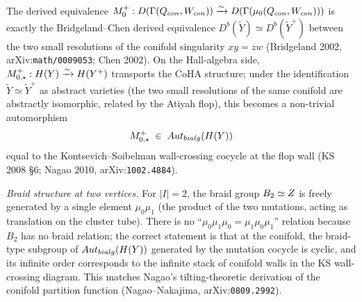 \begin{example}
The derived equivalence $M_0^{+} : D(\Gamma(Q_{con},
W_{con})) \xrightarrow{\sim} D(\Gamma(\mu_0(Q_{con},
W_{con})))$ is exactly the Bridgeland--Chen derived equivalence
$D^b(\tilde Y) \simeq D^b(\tilde Y^{+})$ between the two small resolutions
of the conifold singularity $xy = zw$ (Bridgeland 2002, arXiv:\texttt{math/0009053};
Chen 2002). On the Hall-algebra side, $M_{0,\star}^{+} :
H(Y) \xrightarrow{\sim} H(Y^{+})$ transports the CoHA
structure; under the identification $\tilde Y \simeq \tilde Y^{+}$ as
abstract varieties (the two small resolutions of the same conifold are
abstractly isomorphic, related by the Atiyah flop), this becomes a
non-trivial automorphism
\[
  M_{0,\star}^{+} \;\in\; Aut_{bialg}(H(Y))
\]
equal to the Kontsevich--Soibelman wall-crossing cocycle at the flop wall
(KS 2008 \S6; Nagao 2010, arXiv:\texttt{1002.4884}).

\emph{Braid structure at two vertices.} For $|I| = 2$, the braid group
$B_2 \simeq Z$ is freely generated by a single element $\mu_0 \mu_1$
(the product of the two mutations, acting as translation on the cluster
tube). There is no ``$\mu_0 \mu_1 \mu_0 = \mu_1 \mu_0 \mu_1$'' relation
because $B_2$ has no braid relation; the correct statement is that at the
conifold, the braid-type subgroup of $Aut_{bialg}(H(Y))$
generated by the mutation cocycle is cyclic, and its infinite order
corresponds to the infinite stack of conifold walls in the KS wall-crossing
diagram. This matches Nagao's tilting-theoretic derivation of the conifold
partition function (Nagao--Nakajima, arXiv:\texttt{0809.2992}).
\end{example}

